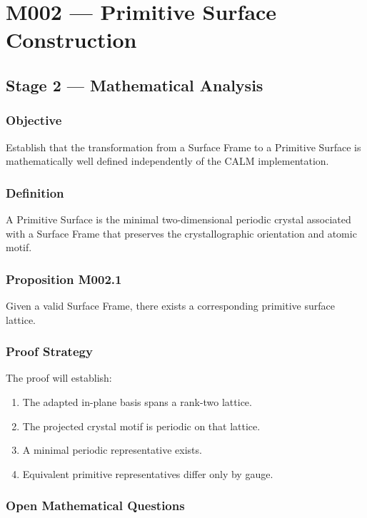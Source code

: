 
\chapter{M002 --- Primitive Surface Construction}

\section{Stage 2 --- Mathematical Analysis}

\subsection{Objective}

Establish that the transformation from a Surface Frame to a Primitive
Surface is mathematically well defined independently of the CALM
implementation.

\subsection{Definition}

A Primitive Surface is the minimal two-dimensional periodic crystal
associated with a Surface Frame that preserves the crystallographic
orientation and atomic motif.

\subsection{Proposition M002.1}

Given a valid Surface Frame, there exists a corresponding primitive
surface lattice.

\subsection{Proof Strategy}

The proof will establish:

\begin{enumerate}
\item The adapted in-plane basis spans a rank-two lattice.
\item The projected crystal motif is periodic on that lattice.
\item A minimal periodic representative exists.
\item Equivalent primitive representatives differ only by gauge.
\end{enumerate}

\subsection{Open Mathematical Questions}


